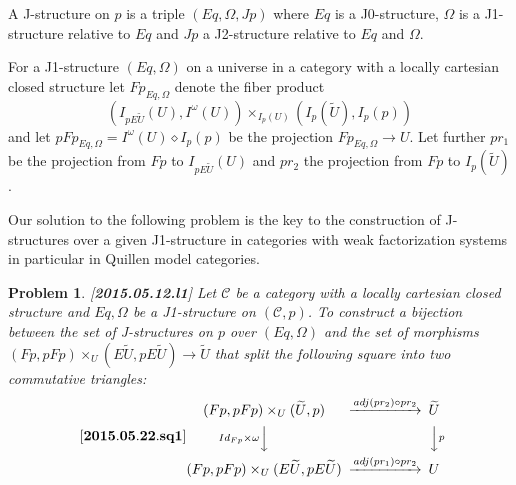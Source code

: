 \documentclass[12pt]{article}
\newenvironment{eq}{\begin{equation}}{\end{equation}}
\newtheorem{problem}[proposition]{Problem}
\newcommand{\llabel}[1]{\label{#1}[{\bf #1}]}
\newcommand{\sr}{\rightarrow}
\newcommand{\wt}{\widetilde}
\newcommand{\dd}{\diamond}
\begin{document}
A J-structure on $p$ is a triple $(Eq,\Omega,Jp)$ where $Eq$ is a J0-structure, $\Omega$ is a J1-structure relative to $Eq$ and $Jp$ a J2-structure relative to $Eq$ and $\Omega$.

For a J1-structure $(Eq,\Omega)$ on a universe in a category with a locally cartesian closed structure let $Fp_{Eq,\Omega}$ denote the fiber product
%
$$(I_{pE\wt{U}}(U), I^{\omega}(U)) \times_{I_p(U)} (I_p(\wt{U}), I_p(p))$$
%
and let $pFp_{Eq,\Omega}=I^{\omega}(U)\dd I_p(p)$ be the projection $Fp_{Eq,\Omega}\sr U$. Let further $pr_1$ be the projection from $Fp$ to $I_{pE\wt{U}}(U)$ and $pr_2$ the projection from $Fp$ to $I_p(\wt{U})$.

Our solution to the following problem is the key to the construction of J-structures over a given J1-structure in categories with weak factorization systems in particular in Quillen model categories. 
%
\begin{problem}
\llabel{2015.05.12.l1}
Let $\mathcal C$ be a category with a locally cartesian closed structure and $Eq,\Omega$ be a J1-structure on $({\mathcal C},p)$. To construct a bijection 
between the set of J-structures on $p$ over $(Eq,\Omega)$ and the set of morphisms $(Fp,pFp)\times_U(E\wt{U},pE\wt{U})\sr \wt{U}$ that split the following square into two commutative triangles:
%
\begin{eq}\llabel{2015.05.22.sq1}
\begin{CD}
(Fp,pFp)\times_U(\wt{U},p) @>adj(pr_2)\circ pr_2>> \wt{U}\\
@VId_{Fp}\times \omega VV @VV p V\\
(Fp,pFp)\times_U(E\wt{U},pE\wt{U}) @>adj(pr_1)\circ pr_2>> U
\end{CD}
\end{eq}
%
\end{problem}
%
\end{document}
